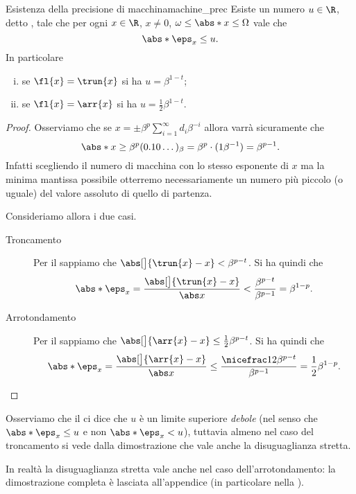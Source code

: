 \begin{theorem}
    {Esistenza della precisione di macchina}{machine_prec}
    Esiste un numero $u \in \R$, detto , tale che per ogni $x \in \R$, $x \neq 0$, $\omega \leq \abs*{x}\leq \Omega$ vale che \[
        \abs*{\eps_x} \leq u.
    \] In particolare \begin{enumerate}[(i)]
        \item se $\fl{x} = \trun{x}$ si ha $u = \beta^{1-t}$;
        \item se $\fl{x} = \arr{x}$ si ha $u = \frac12\beta^{1-t}$. 
    \end{enumerate}
\end{theorem}
\begin{proof}
    Osserviamo che se $x = \pm\beta^p \sum_{i=1}^\infty d_i\beta^{-i}$ allora varrà sicuramente che \[
        \abs*{x} \geq \beta^p (0.10\dots)_\beta = \beta^p \cdot (1 \beta^{-1}) = \beta^{p-1}.
    \] Infatti scegliendo il numero di macchina con lo stesso esponente di $x$ ma la minima mantissa possibile otterremo necessariamente un numero più piccolo (o uguale) del valore assoluto di quello di partenza.

    Consideriamo allora i due casi.
    \begin{description}
        \item[Troncamento] Per il  sappiamo che $\abs[\big]{\trun{x} - x} < \beta^{p-t}$. Si ha quindi che \[
                \abs*{\eps_x} 
            = \frac{\abs[\big]{\trun{x} - x}}{\abs x} 
            < \frac{\beta^{p-t}}{\beta^{p-1}}
            = \beta^{1-p}.
        \] 
        \item[Arrotondamento] Per il  sappiamo che $\abs[\big]{\arr{x} - x} \leq \frac12\beta^{p-t}$. Si ha quindi che \[
                 \abs*{\eps_x} 
            =    \frac{\abs[\big]{\arr{x} - x}}{\abs x} 
            \leq \frac{\nicefrac12\beta^{p-t}}{\beta^{p-1}}
            =    \frac12\beta^{1-p}. \qedhere
        \]
    \end{description}
\end{proof}

Osserviamo che il  ci dice che $u$ è un limite superiore \emph{debole} (nel senso che $\abs*{\eps_x} \leq u$ e non $\abs*{\eps_x} < u$), tuttavia almeno nel caso del troncamento si vede dalla dimostrazione che vale anche la disuguaglianza stretta. 

In realtà la disuguaglianza stretta vale anche nel caso dell'arrotondamento: la dimostrazione completa è lasciata all'appendice (in particolare nella ).
 